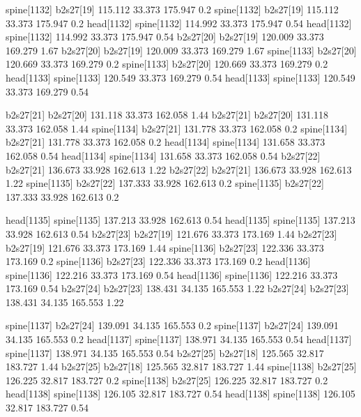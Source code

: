 spine[1132]    b2s27[19]    115.112    33.373    175.947    0.2
spine[1132]    b2s27[19]    115.112    33.373    175.947    0.2
head[1132]    spine[1132]    114.992    33.373    175.947    0.54
head[1132]    spine[1132]    114.992    33.373    175.947    0.54
b2s27[20]    b2s27[19]    120.009    33.373    169.279    1.67
b2s27[20]    b2s27[19]    120.009    33.373    169.279    1.67
spine[1133]    b2s27[20]    120.669    33.373    169.279    0.2
spine[1133]    b2s27[20]    120.669    33.373    169.279    0.2
head[1133]    spine[1133]    120.549    33.373    169.279    0.54
head[1133]    spine[1133]    120.549    33.373    169.279    0.54


b2s27[21]    b2s27[20]    131.118    33.373    162.058    1.44
b2s27[21]    b2s27[20]    131.118    33.373    162.058    1.44
spine[1134]    b2s27[21]    131.778    33.373    162.058    0.2
spine[1134]    b2s27[21]    131.778    33.373    162.058    0.2
head[1134]    spine[1134]    131.658    33.373    162.058    0.54
head[1134]    spine[1134]    131.658    33.373    162.058    0.54
b2s27[22]    b2s27[21]    136.673    33.928    162.613    1.22
b2s27[22]    b2s27[21]    136.673    33.928    162.613    1.22
spine[1135]    b2s27[22]    137.333    33.928    162.613    0.2
spine[1135]    b2s27[22]    137.333    33.928    162.613    0.2


head[1135]    spine[1135]    137.213    33.928    162.613    0.54
head[1135]    spine[1135]    137.213    33.928    162.613    0.54
b2s27[23]    b2s27[19]    121.676    33.373    173.169    1.44
b2s27[23]    b2s27[19]    121.676    33.373    173.169    1.44
spine[1136]    b2s27[23]    122.336    33.373    173.169    0.2
spine[1136]    b2s27[23]    122.336    33.373    173.169    0.2
head[1136]    spine[1136]    122.216    33.373    173.169    0.54
head[1136]    spine[1136]    122.216    33.373    173.169    0.54
b2s27[24]    b2s27[23]    138.431    34.135    165.553    1.22
b2s27[24]    b2s27[23]    138.431    34.135    165.553    1.22


spine[1137]    b2s27[24]    139.091    34.135    165.553    0.2
spine[1137]    b2s27[24]    139.091    34.135    165.553    0.2
head[1137]    spine[1137]    138.971    34.135    165.553    0.54
head[1137]    spine[1137]    138.971    34.135    165.553    0.54
b2s27[25]    b2s27[18]    125.565    32.817    183.727    1.44
b2s27[25]    b2s27[18]    125.565    32.817    183.727    1.44
spine[1138]    b2s27[25]    126.225    32.817    183.727    0.2
spine[1138]    b2s27[25]    126.225    32.817    183.727    0.2
head[1138]    spine[1138]    126.105    32.817    183.727    0.54
head[1138]    spine[1138]    126.105    32.817    183.727    0.54


